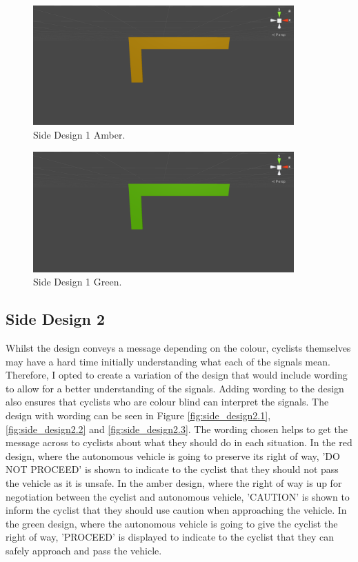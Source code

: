 \documentclass{l4proj}
\begin{document}
\begin{figure}[H]
    \centering
    \includegraphics[width=10cm]{images/side_design1.2.png}
    \caption{Side Design 1 Amber.}
    \label{fig:side_design1.2}
\end{figure}

\begin{figure}[H]
    \centering
    \includegraphics[width=10cm]{images/side_design1.3.png}
    \caption{Side Design 1 Green.}
    \label{fig:side_design1.3}
\end{figure}

\subsection{Side Design 2}

Whilst the design conveys a message depending on the colour, cyclists themselves may have a hard time initially understanding what each of the signals mean. Therefore, I opted to create a variation of the design that would include wording to allow for a better understanding of the signals. Adding wording to the design also ensures that cyclists who are colour blind can interpret the signals. The design with wording can be seen in Figure \ref{fig:side_design2.1}, \ref{fig:side_design2.2} and \ref{fig:side_design2.3}. The wording chosen helps to get the message across to cyclists about what they should do in each situation. In the red design, where the autonomous vehicle is going to preserve its right of way, 'DO NOT PROCEED' is shown to indicate to the cyclist that they should not pass the vehicle as it is unsafe. In the amber design, where the right of way is up for negotiation between the cyclist and autonomous vehicle, 'CAUTION' is shown to inform the cyclist that they should use caution when approaching the vehicle. In the green design, where the autonomous vehicle is going to give the cyclist the right of way, 'PROCEED' is displayed to indicate to the cyclist that they can safely approach and pass the vehicle.
\end{document}
